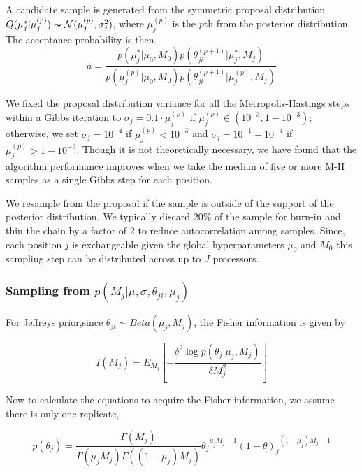 \documentclass[11pt,reqno]{amsart}
\begin{document}
A candidate sample is generated from the symmetric proposal distribution $Q(\mu_j^* | \mu_j^{(p)}) \thicksim \mathcal{N}(\mu_j^{(p)}, \sigma_j^2)$, where $\mu_j^{(p)}$ is the $p$th from the posterior distribution. The acceptance probability is then
\begin{equation}
	a = \frac{ p(\mu_j^* | \mu_0, M_0) p(\theta^{(p+1)}_{ji} | \mu_j^*, M_j) } {p(\mu_j^{(p)} | \mu_0, M_0) p(\theta^{(p+1)}_{ji} | \mu_j^{(p)}, M_j)}
\end{equation}

We fixed the proposal distribution variance for all the Metropolis-Hastings steps within a Gibbs iteration to $\sigma_j = 0.1 \cdot \mu_j^{(p)}$ if $\mu_j^{(p)} \in (10^{-3},1-10^{-3})$; otherwise, we set $\sigma_j = 10^{-4}$ if $\mu_j^{(p)}< 10^{-3}$ and $\sigma_j = 10^{-1}-10^{-4}$ if $\mu_j^{(p)}>1-10^{-3}$. Though it is not theoretically necessary, we have found that the algorithm performance improves when we take the median of five or more M-H samples as a single Gibbs step for each position.


We resample from the proposal if the sample is outside of the support of the posterior distribution. We typically discard 20\% of the sample for burn-in and thin the chain by a factor of 2 to reduce autocorrelation among samples. Since, each position $j$ is exchangeable given the global hyperparameters $\mu_0$ and $M_0$ this sampling step can be distributed across up to $J$ processors.

\subsubsection{Sampling from $p \left( M_{j} |\mu,\sigma, \theta_{ji},\mu_j\right)$}
For Jeffreys prior,since ${\theta }_{ji}\sim Beta\left( {\mu }_{j},{M}_{j}\right)$, the Fisher information is given by

\begin{equation}\label{equ:JefferyInference}
I\left({M}_{j}\right)={E}_{{M}_{j}}\left[ -\frac{\delta ^{2}\log p\left(\theta _{j}|\mu_{j},M_{j}\right)}{\delta M^{2}_{j}}\right]
\end{equation}

Now to calculate the equations to acquire the Fisher information, we assume there is only one replicate,

\begin{equation}\label{eqn:Betapdf}
p\left({\theta }_{j} \right)= \frac{\Gamma \left({M}_{j} \right)}{\Gamma \left({\mu }_{j} {M}_{j}\right)\Gamma \left(( 1-{\mu }_{j}){M}_{j}\right)} {{\theta}_{j}}^{{\mu}_{j}{M}_{j}-1}{\left(1-\theta\right)_{j}}^{\left(1-{\mu}_{j}\right){M}_{j}-1}
\end{equation}
\end{document}
